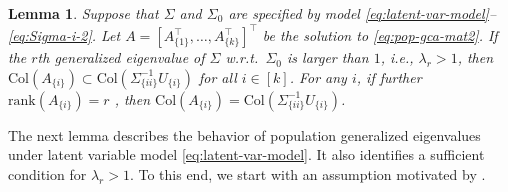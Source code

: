 \documentclass[11pt]{article}
\newcommand{\nb}[1]{\textcolor{orange}{\texttt{[#1]}}}
\newcommand{\rev}[1]{\textcolor{black}{#1}}
\newcommand{\dc}[1]{\{#1\}} %
\newcommand{\0}{{\mathbf{0}}}
\newcommand{\rank}{{\mathrm{rank}}}
\newcommand{\col}{\mathrm{Col}}
\newtheorem{lemma}[theorem]{Lemma}
\begin{document}

\begin{lemma}\label{lemma:latent_var}
Suppose that $\Sigma$ and $\Sigma_0$ are specified by model \eqref{eq:latent-var-model}--\eqref{eq:Sigma-i-2}. 
Let $A = [{ A_{\dc{1}}^\top},\dots, { A_{\dc{k}}^\top}]^\top$ be the solution to \eqref{eq:pop-gca-mat2}.
If the $r$th generalized eigenvalue of $\Sigma$ w.r.t.~$\Sigma_0$ is larger than $1$, i.e., $\lambda_r > 1$, 
then $\col(A_{\dc{i}}) \subset \col({\Sigma_{\dc{ii}}^{-1}}U_{\dc{i}})$ for all $i\in [k]$. 
For any $i$, if further $\rank(A_{\dc{i}})=r$ , then
$\col (A_{\dc{i}})=\col ({\Sigma_{\dc{ii}}^{-1}}U_{\dc{i}})$.
\end{lemma}






The next lemma describes the behavior of population generalized eigenvalues
under latent variable model \eqref{eq:latent-var-model}. 
It also identifies a sufficient condition for $\lambda_r > 1$.
To this end, we start with
an assumption motivated by 
\cite{fan2019estimating}.
\iffalse
which utilize the structure of eigenvalues to find the latent dimension for factor model \nb{I don't get the last phrase}. 
\fi
\end{document}
